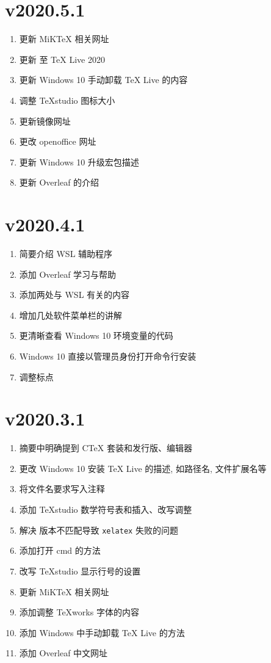 \section*{v2020.5.1}

\begin{enumerate}
  \item 更新 MiK\TeX{} 相关网址
  \item 更新 至 \TeX{} Live 2020
  \item 更新 Windows 10 手动卸载 \TeX{} Live 的内容
  \item 调整 \TeX studio 图标大小
  \item 更新镜像网址
  \item 更改 openoffice 网址
  \item 更新 Windows 10 升级宏包描述
  \item 更新 Overleaf 的介绍
\end{enumerate}

\section*{v2020.4.1}

\begin{enumerate}
  \item 简要介绍 WSL 辅助程序
  \item 添加 Overleaf 学习与帮助
  \item 添加两处与 WSL 有关的内容
  \item 增加几处软件菜单栏的讲解
  \item 更清晰查看 Windows 10 环境变量的代码
  \item Windows 10 直接以管理员身份打开命令行安装
  \item 调整标点
\end{enumerate}

\section*{v2020.3.1}

\begin{enumerate}
    \item 摘要中明确提到 C\TeX{} 套装和发行版、编辑器
    \item 更改 Windows 10 安装 \TeX{} Live 的描述, 如路径名, 文件扩展名等
    \item 将文件名要求写入注释
    \item 添加 \TeX studio 数学符号表和插入、改写调整
    \item 解决 \LaTeXe 版本不匹配导致 \texttt{xelatex} 失败的问题
    \item 添加打开 \textsf{cmd} 的方法
    \item 改写 \TeX studio 显示行号的设置
    \item 更新 MiK\TeX{} 相关网址
    \item 添加调整 \TeX works 字体的内容
    \item 添加 Windows 中手动卸载 \TeX{} Live 的方法
    \item 添加 Overleaf 中文网址
\end{enumerate}

